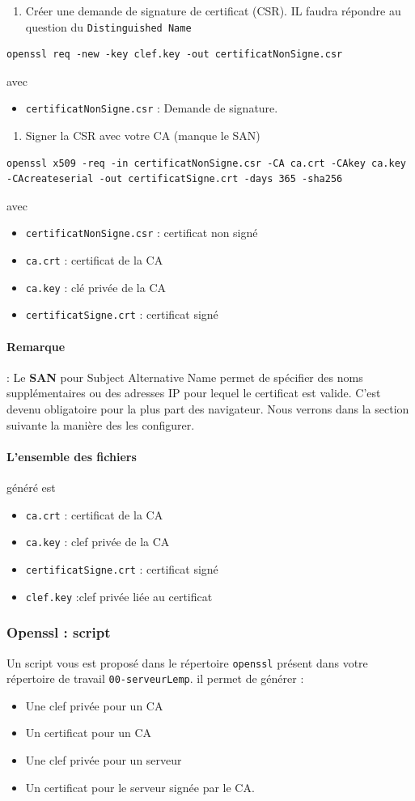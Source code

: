 \documentclass[french, 12pt]{article}%
\newcommand{\itemE}{\item[$\bullet$]}
\begin{document}
\begin{enumerate}[resume]
\item Créer une demande de signature de certificat (CSR). IL faudra répondre au question du \verb?Distinguished Name?
\end{enumerate}
\begin{lstlisting}[style=commande]
openssl req -new -key clef.key -out certificatNonSigne.csr
\end{lstlisting}
avec 
\begin{itemize}
\itemE \verb?certificatNonSigne.csr? : Demande de signature. 
\end{itemize}


\begin{enumerate}[resume]
\item Signer la CSR avec votre CA (manque le SAN)
\end{enumerate}
\begin{lstlisting}[style=commande]
openssl x509 -req -in certificatNonSigne.csr -CA ca.crt -CAkey ca.key -CAcreateserial -out certificatSigne.crt -days 365 -sha256
\end{lstlisting}
avec 
\begin{itemize}
\itemE \verb?certificatNonSigne.csr? : certificat non signé
\itemE \verb?ca.crt? : certificat de la CA
\itemE \verb?ca.key? : clé privée de la CA
\itemE \verb?certificatSigne.crt? : certificat signé
\end{itemize}
\paragraph{Remarque } :  Le \textbf{SAN} pour Subject Alternative Name permet de spécifier des noms supplémentaires ou des adresses IP pour lequel le certificat est valide. C'est devenu obligatoire pour la plus part des navigateur.  Nous verrons dans la section suivante la manière des les configurer.


\paragraph{L'ensemble des fichiers } généré est 
\begin{itemize}
\itemE \verb?ca.crt? : certificat de la CA
\itemE \verb?ca.key? : clef privée de la CA
\itemE \verb?certificatSigne.crt? : certificat signé
\itemE \verb?clef.key? :clef privée liée au certificat
\end{itemize}

\subsubsection{Openssl : script}
\label{lbl_script}
Un script vous est proposé dans le répertoire \verb?openssl? présent dans votre répertoire de travail \verb?00-serveurLemp?. il permet de générer : 
\begin{itemize}
\itemE Une clef privée pour un CA
\itemE Un certificat pour un CA
\itemE Une clef privée pour un serveur
\itemE Un certificat pour le serveur signée par le CA.
\end{itemize}
\end{document}
